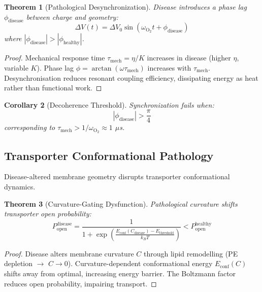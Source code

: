 \documentclass[11pt,twocolumn,a4paper]{article}
\newtheorem{theorem}{Theorem}[section]
\newtheorem{corollary}[theorem]{Corollary}
\theoremstyle{definition}
\theoremstyle{remark}
\begin{document}
\begin{theorem}[Pathological Desynchronization]
\label{thm:pathological_desync}
Disease introduces a phase lag $\phi_{\text{disease}}$ between charge and geometry:
\begin{equation}
\Delta V(t) = \Delta V_0 \sin(\omega_{\text{O}_2} t + \phi_{\text{disease}})
\end{equation}
where $|\phi_{\text{disease}}| > |\phi_{\text{healthy}}|$.
\end{theorem}

\begin{proof}
Mechanical response time $\tau_{\text{mech}} = \eta/K$ increases in disease (higher $\eta$, variable $K$). Phase lag $\phi = \arctan(\omega \tau_{\text{mech}})$ increases with $\tau_{\text{mech}}$. Desynchronisation reduces resonant coupling efficiency, dissipating energy as heat rather than functional work.
\end{proof}

\begin{corollary}[Decoherence Threshold]
\label{cor:decoherence_threshold}
Synchronization fails when:
\begin{equation}
|\phi_{\text{disease}}| > \frac{\pi}{4}
\end{equation}
corresponding to $\tau_{\text{mech}} > 1/\omega_{\text{O}_2} \approx 1$ $\mu$s.
\end{corollary}

\subsection{Transporter Conformational Pathology}

Disease-altered membrane geometry disrupts transporter conformational dynamics.

\begin{theorem}[Curvature-Gating Dysfunction]
\label{thm:curvature_gating_dysfunction}
Pathological curvature shifts transporter open probability:
\begin{equation}
P_{\text{open}}^{\text{disease}} = \frac{1}{1 + \exp\left(\frac{E_{\text{conf}}(C_{\text{disease}}) - E_{\text{threshold}}}{k_B T}\right)} < P_{\text{open}}^{\text{healthy}}
\end{equation}
\end{theorem}

\begin{proof}
Disease alters membrane curvature $C$ through lipid remodelling (PE depletion $\to$ $C \to 0$). Curvature-dependent conformational energy $E_{\text{conf}}(C)$ shifts away from optimal, increasing energy barrier. The Boltzmann factor reduces open probability, impairing transport.
\end{proof}
\end{document}

